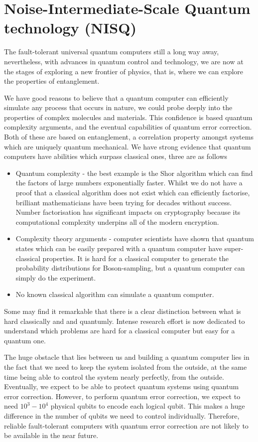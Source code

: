 \section{Noise-Intermediate-Scale Quantum technology (NISQ)}

The fault-tolerant universal quantum computers still a long way away, nevertheless, 
with advances in quantum control and technology,
we are now at the stages of exploring a new frontier of physics, that is, where we can
explore the properties of entanglement.

We have good reasons to believe that a quantum computer can efficiently simulate any process that occurs in nature, we could probe deeply into the properties of complex molecules and materials. This confidence is based quantum complexity arguments, and the eventual capabilities of quantum error correction. Both of these are based on entanglement, a correlation property amongst systems which are uniquely quantum mechanical. We have strong evidence that quantum computers have abilities which surpass classical ones, three are as follows
\begin{itemize}
\item Quantum complexity - the best example is the Shor algorithm \cite{} which can find the factors of large numbers exponentially faster. Whilst we do not have a proof that a classical algorithm does not exist which can efficiently factorise, brilliant mathematicians have been trying for decades without success. Number factorisation has significant impacts on cryptography because its computational complexity underpins all of the modern encryption. 
% 
\item Complexity theory arguments - computer scientists have shown that quantum states which can be easily prepared with a quantum computer have super-classical properties. It is hard for a classical computer to generate the probability distributions for Boson-sampling, but a quantum computer can simply do the experiment.
% 
\item No known classical algorithm can simulate a quantum computer.
\end{itemize}

Some may find it remarkable that there is a clear distinction between what is hard classically and and quantumly. Intense research effort is now dedicated to understand which problems are hard for a classical computer but easy for a quantum one.


The huge obstacle that lies between us and building a quantum computer lies in the fact that we need to keep the system isolated from the outside, at the same time being able to control the system nearly perfectly, from the outside. Eventually, we expect to be able to protect quantum systems using quantum error correction. However, to perform quantum error correction, we expect to need $10^3 - 10^4$ physical qubits to encode each logical qubit. This makes a huge difference in the number of qubits we need to control individually. Therefore, reliable fault-tolerant computers with quantum error correction are not likely to be available in the near future.



